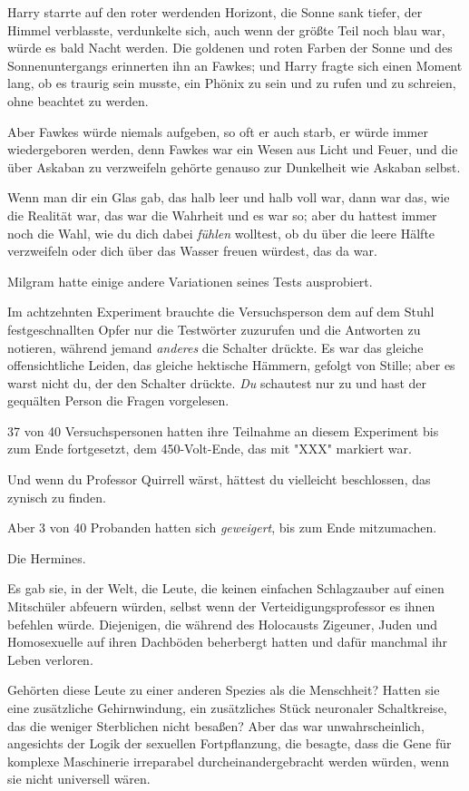 {Harry starrte auf den roter werdenden Horizont, die Sonne sank tiefer, der Himmel verblasste, verdunkelte sich, auch wenn der größte Teil noch blau war, würde es bald Nacht werden. Die goldenen und roten Farben der Sonne und des Sonnenuntergangs erinnerten ihn an Fawkes; und Harry fragte sich einen Moment lang, ob es traurig sein musste, ein Phönix zu sein und zu rufen und zu schreien, ohne beachtet zu werden.

Aber Fawkes würde niemals aufgeben, so oft er auch starb, er würde immer wiedergeboren werden, denn Fawkes war ein Wesen aus Licht und Feuer, und die über Askaban zu verzweifeln gehörte genauso zur Dunkelheit wie Askaban selbst.

Wenn man dir ein Glas gab, das halb leer und halb voll war, dann war das, wie die Realität war, das war die Wahrheit und es war so; aber du hattest immer noch die Wahl, wie du dich dabei \emph{fühlen} wolltest, ob du über die leere Hälfte verzweifeln oder dich über das Wasser freuen würdest, das da war.

Milgram hatte einige andere Variationen seines Tests ausprobiert.

Im achtzehnten Experiment brauchte die Versuchsperson dem auf dem Stuhl festgeschnallten Opfer nur die Testwörter zuzurufen und die Antworten zu notieren, während jemand \emph{anderes} die Schalter drückte. Es war das gleiche offensichtliche Leiden, das gleiche hektische Hämmern, gefolgt von Stille; aber es warst nicht du, der den Schalter drückte. \emph{Du} schautest nur zu und hast der gequälten Person die Fragen vorgelesen.

37 von 40 Versuchspersonen hatten ihre Teilnahme an diesem Experiment bis zum Ende fortgesetzt, dem 450-Volt-Ende, das mit "XXX" markiert war.

Und wenn du Professor Quirrell wärst, hättest du vielleicht beschlossen, das zynisch zu finden.

Aber 3 von 40 Probanden hatten sich \emph{geweigert}, bis zum Ende mitzumachen.

Die Hermines.

Es gab sie, in der Welt, die Leute, die keinen einfachen Schlagzauber auf einen Mitschüler abfeuern würden, selbst wenn der Verteidigungsprofessor es ihnen befehlen würde. Diejenigen, die während des Holocausts Zigeuner, Juden und Homosexuelle auf ihren Dachböden beherbergt hatten und dafür manchmal ihr Leben verloren.

Gehörten diese Leute zu einer anderen Spezies als die Menschheit? Hatten sie eine zusätzliche Gehirnwindung, ein zusätzliches Stück neuronaler Schaltkreise, das die weniger Sterblichen nicht besaßen? Aber das war unwahrscheinlich, angesichts der Logik der sexuellen Fortpflanzung, die besagte, dass die Gene für komplexe Maschinerie irreparabel durcheinandergebracht werden würden, wenn sie nicht universell wären.

}
